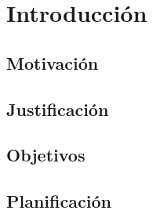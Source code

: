 \chapter{Introducción}

\section{Motivación}

\section{Justificación}


\section{Objetivos}

\section{Planificación}